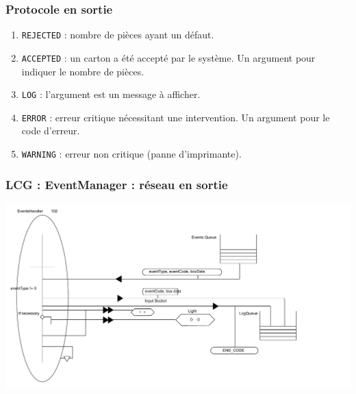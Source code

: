 \documentclass{beamer}
\begin{document}
	

	\begin{frame}

	\frametitle{Protocole en sortie}

	    \begin{enumerate}

	    \item \texttt{REJECTED} : nombre de pièces ayant un défaut.

	    \item \texttt{ACCEPTED} : un carton a été accepté par le système. Un argument pour indiquer le nombre de pièces.

	    \item \texttt{LOG} : l'argument est un message à afficher.

	    \item \texttt{ERROR} : erreur critique nécessitant une intervention. Un argument pour le code d'erreur.

	    \item \texttt{WARNING} : erreur non critique (panne d'imprimante).

	    \end{enumerate}

	\end{frame}

	

	\begin{frame}

	    \frametitle{LCG : EventManager : réseau en sortie}

	    \includegraphics[width=\textwidth]{../SchemasLCG/src/EventsManager.pdf}

	\end{frame}

	

	
\end{document}
